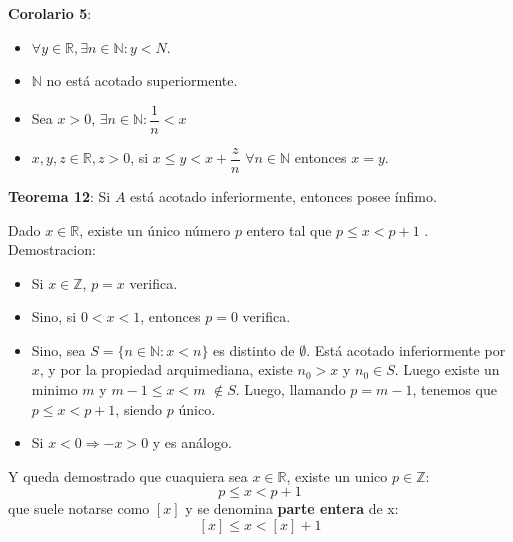 \documentclass[11pt,a4paper]{article}
\begin{document}
\noindent \textbf{Corolario 5}:
\begin{itemize}
\item $\forall y \in \mathbb{R}, \exists n \in \mathbb{N} : y < N$.
\item $\mathbb{N}$ no est\'a acotado superiormente.
\item Sea $x > 0$, $\exists n \in \mathbb{N} : \dfrac{1}{n} < x$
\item $x,y,z \in \mathbb{R}, z > 0$, si $x \leq y < x + \dfrac{z}{n}$ $\forall n \in \mathbb{N}$ entonces $x = y$.
\end{itemize}

\noindent \textbf{Teorema 12}: Si $A$ est\'a acotado inferiormente, entonces posee \'infimo.

\noindent \dotfill

Dado $x \in \mathbb{R}$, existe un \'unico n\'umero $p$ entero tal que $p \leq x < p + 1$ . Demostracion:
\begin{itemize}
\item Si $x \in \mathbb{Z}$, $p=x$ verifica.
\item Sino, si $0 < x < 1$, entonces $p = 0$ verifica.
\item Sino, sea $S = \{ n \in \mathbb{N} : x < n \}$ es distinto de $\emptyset$. Est\'a acotado inferiormente por $x$, y por la propiedad arquimediana, existe $n_0 > x$ y $n_0 \in S$. Luego existe un minimo $m$ y $m-1 \leq x < m$ $ \not \in S$. Luego, llamando $p = m-1$, tenemos que $p \leq x < p+1$, siendo $p$ \'unico.
\item Si $x < 0 \Rightarrow -x > 0$ y es an\'alogo.
\end{itemize}
Y queda demostrado que cuaquiera sea $x \in \mathbb{R}$, existe un unico $p \in \mathbb{Z} : $
$$p \leq x < p+1$$
que suele notarse como $[x]$ y se denomina \textbf{parte entera} de x:
$$[x] \leq x < [x] + 1$$
\end{document}

